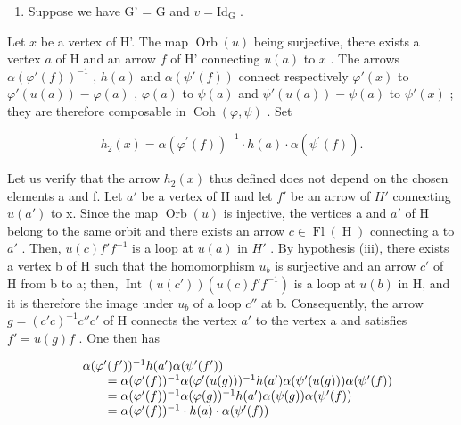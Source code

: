 \begin{enumerate}
\def\labelenumi{\arabic{enumi})}
\setcounter{enumi}{1}
\tightlist
\item
  Suppose we have G' = G and \(v = \mathrm{Id}_{\mathrm{G}}\) .
\end{enumerate}

Let \(x\) be a vertex of H'. The map \(\operatorname{Orb}(u)\) being surjective, there exists a vertex \(a\) of H and an arrow \(f\) of H' connecting \(u(a)\) to \(x\) . The arrows \(\alpha(\varphi'(f))^{-1}\) , \(h(a)\) and \(\alpha(\psi'(f))\) connect respectively \(\varphi'(x)\) to \(\varphi'(u(a)) = \varphi(a)\) , \(\varphi(a)\) to \(\psi(a)\) and \(\psi'(u(a)) = \psi(a)\) to \(\psi'(x)\) ; they are therefore composable in \(\operatorname{Coh}(\varphi, \psi)\) . Set

\[
h _ {2} (x) = \alpha (\varphi^ {\prime} (f)) ^ {- 1} \cdot h (a) \cdot \alpha (\psi^ {\prime} (f)).
\]

Let us verify that the arrow \(h_{2}(x)\) thus defined does not depend on the chosen elements a and f. Let \(a'\) be a vertex of H and let \(f'\) be an arrow of \(H'\) connecting \(u(a')\) to x. Since the map \(\operatorname{Orb}(u)\) is injective, the vertices a and \(a'\) of H belong to the same orbit and there exists an arrow \(c \in \operatorname{Fl}(\operatorname{H})\) connecting a to \(a'\) . Then, \(u(c)f'f^{-1}\) is a loop at \(u(a)\) in \(H'\) . By hypothesis (iii), there exists a vertex b of H such that the homomorphism \(u_{b}\) is surjective and an arrow \(c'\) of H from b to a; then, \(\operatorname{Int}(u(c'))(u(c)f'f^{-1})\) is a loop at \(u(b)\) in H, and it is therefore the image under \(u_{b}\) of a loop \(c''\) at b. Consequently, the arrow \(g = (c'c)^{-1}c''c'\) of H connects the vertex \(a'\) to the vertex a and satisfies \(f' = u(g)f\) . One then has

\[
\begin{array}{r l} & {\alpha (\varphi^ {\prime} (f ^ {\prime})) ^ {- 1} h (a ^ {\prime}) \alpha (\psi^ {\prime} (f ^ {\prime}))} \\ & {\qquad = \alpha (\varphi^ {\prime} (f)) ^ {- 1} \alpha (\varphi^ {\prime} (u (g))) ^ {- 1} h (a ^ {\prime}) \alpha (\psi^ {\prime} (u (g))) \alpha (\psi^ {\prime} (f))} \\ & {\qquad = \alpha (\varphi^ {\prime} (f)) ^ {- 1} \alpha (\varphi (g)) ^ {- 1} h (a ^ {\prime}) \alpha (\psi (g)) \alpha (\psi^ {\prime} (f))} \\ & {\qquad = \alpha (\varphi^ {\prime} (f)) ^ {- 1} \cdot h (a) \cdot \alpha (\psi^ {\prime} (f))} \end{array}
\]

